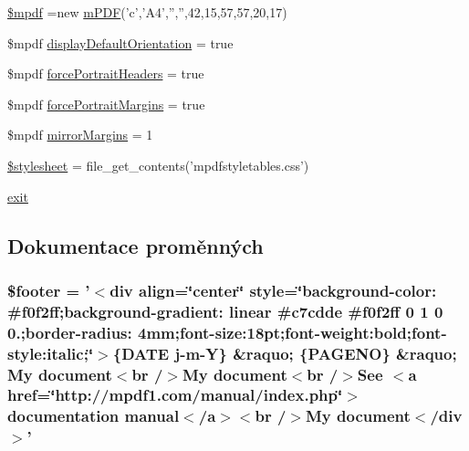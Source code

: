\begin{DoxyCompactItemize}
$$\item 
\hyperlink{example24__orientation__2_8php_ad028f81910d6cbab9b184d2214b3a8f8}{\$mpdf} =new \hyperlink{classm_p_d_f}{m\-P\-D\-F}('c','A4','','',42,15,57,57,20,17)
\item 
\$mpdf \hyperlink{example24__orientation__2_8php_a1d59a8b3178b7cb523a24506c7acc09f}{display\-Default\-Orientation} = true
\item 
\$mpdf \hyperlink{example24__orientation__2_8php_af27b5dac57e9f3a8b4019a1b3b9535fb}{force\-Portrait\-Headers} = true
\item 
\$mpdf \hyperlink{example24__orientation__2_8php_a94dd6299d1daea6eb83470539c3c6ec1}{force\-Portrait\-Margins} = true
\item 
\$mpdf \hyperlink{example24__orientation__2_8php_a24c284cb7774410f65953584ea1fd9c1}{mirror\-Margins} = 1
\item 
\hyperlink{example24__orientation__2_8php_a19e5cf73e817c55a49205e6ec78c88a8}{\$stylesheet} = file\-\_\-get\-\_\-contents('mpdfstyletables.\-css')
\item 
\hyperlink{example24__orientation__2_8php_a6733eb5f605d09eaede9845835d71c4e}{exit}
\end{DoxyCompactItemize}


\subsection{Dokumentace proměnných}
\hypertarget{example24__orientation__2_8php_abaa4216c852c51c380dd8f10d3cfe944}{
\subsubsection[{\$footer}]{\setlength{\rightskip}{0pt plus 5cm}\$footer = '$<$div align=\char`\"{}center\char`\"{} style=\char`\"{}background-\/color\-: \#f0f2ff;background-\/gradient\-: linear \#c7cdde \#f0f2ff 0 1 0 0.;border-\/radius\-: 4mm;font-\/size\-:18pt;font-\/weight\-:bold;font-\/style\-:italic;\char`\"{}$>$\{\-D\-A\-T\-E j-\/m-\/\-Y\} \&raquo; \{\-P\-A\-G\-E\-N\-O\} \&raquo; My document$<$br /$>$\-My document$<$br /$>$\-See $<$a href=\char`\"{}http\-://mpdf1.\-com/manual/index.\-php\char`\"{}$>$documentation manual$<$/a$>$$<$br /$>$\-My document$<$/div$>$'}}\label{example24__orientation__2_8php_abaa4216c852c51c380dd8f10d3cfe944}


